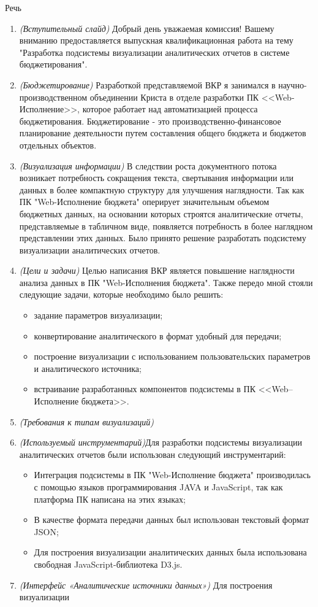 \documentclass[a4paper, 12pt]{report}
\begin{document}
\begin{center}
	\Large Речь
\end{center}\par
\begin{enumerate}[label=\textbf{\arabic*})]
	\item \textit{(Вступительный слайд)} Добрый день уважаемая комиссия! Вашему вниманию предоставляется выпускная квалификационная работа на тему "Разработка подсистемы визуализации аналитических отчетов в системе бюджетирования".
	\item \textit{(Бюджетирование)} Разработкой представляемой ВКР я занимался в научно-производственном объединении Криста в отделе разработки ПК <<Web-Исполнение>>, которое работает над автоматизацией процесса бюджетирования. Бюджетирование - это производственно-финансовое планирование деятельности путем составления общего бюджета и бюджетов отдельных объектов.
	\item \textit{(Визуализация информации)} В следствии роста документного потока возникает потребность сокращения текста, свертывания информации или данных в более компактную структуру для улучшения наглядности. Так как ПК "Web-Исполнение бюджета" оперирует значительным объемом бюджетных данных, на основании которых строятся аналитические отчеты, представляемые в табличном виде, появляется потребность в более наглядном представлении этих данных. Было принято решение разработать подсистему визуализации аналитических отчетов.
	\item \textit{(Цели и задачи)} Целью написания ВКР является повышение наглядности анализа данных в ПК "Web-Исполнения бюджета". Также передо мной стояли следующие задачи, которые необходимо было решить:
		\begin{itemize}
			\item задание параметров визуализации;
			\item конвертирование аналитического в формат удобный для передачи;
			\item построение визуализации с использованием пользовательских параметров и аналитического источника;
			\item встраивание разработанных компонентов подсистемы в ПК <<Web–Ис\-пол\-не\-ние бюджета>>.
		\end{itemize}
	\item \textit{(Требования к типам визуализаций)} 
	\item \textit{(Используемый инструментарий)}Для разработки подсистемы визуализации аналитических отчетов были использован следующий инструментарий:
		\begin{itemize}
			\item Интеграция подсистемы в ПК "Web-Исполнение бюджета" производилась с помощью языков программирования JAVA и JavaScript, так как платформа ПК написана на этих языках;
			\item В качестве формата передачи данных был использован текстовый формат JSON;
			\item Для построения визуализации аналитических данных была использована свободная JavaScript-библиотека D3.js.
		\end{itemize}
	\item \textit{(Интерфейс «Аналитические источники данных»)} Для построения визуализации 
\end{enumerate}
\end{document}
